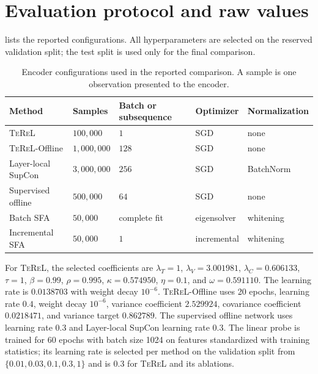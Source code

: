 \documentclass[11pt]{article}
\newcommand{\TeReL}{\textsc{TeReL}}
\newcommand{\TeReLOffline}{\TeReL{}-Offline}
\begin{document}



\appendix

\section{Evaluation protocol and raw values}
\label{app:protocol}

 lists the reported configurations. All
hyperparameters are selected on the reserved validation split; the test split
is used only for the final comparison.

\begin{table}[ht]
\centering
\caption{Encoder configurations used in the reported comparison. A sample is
one observation presented to the encoder.}
\label{tab:configuration}
\small
\begin{tabularx}{\linewidth}{lYYYY}
\toprule
Method & Samples & Batch or subsequence & Optimizer & Normalization \\
\midrule
\TeReL{} & $100{,}000$ & $1$ & SGD & none \\
\TeReLOffline{} & $1{,}000{,}000$ & $128$ & SGD & none \\
Layer-local SupCon & $3{,}000{,}000$ & $256$ & SGD & BatchNorm \\
Supervised offline & $500{,}000$ & $64$ & SGD & none \\
Batch SFA & $50{,}000$ & complete fit & eigensolver & whitening \\
Incremental SFA & $50{,}000$ & $1$ & incremental & whitening \\
\bottomrule
\end{tabularx}
\end{table}

For \TeReL{}, the selected coefficients are
$\lambda_T=1$, $\lambda_V=3.001981$, $\lambda_C=0.606133$,
$\tau=1$, $\beta=0.99$, $\rho=0.995$, $\kappa=0.574950$,
$\eta=0.1$, and $\omega=0.591110$. The learning rate is $0.0138703$ with
weight decay $10^{-6}$. \TeReLOffline{} uses 20 epochs, learning rate
$0.4$, weight decay $10^{-6}$, variance coefficient
$2.529924$, covariance coefficient $0.0218471$, and variance target
$0.862789$. The supervised offline network uses learning rate $0.3$ and
Layer-local SupCon learning rate $0.3$. The linear probe is trained for 60
epochs with batch size 1024 on features standardized with training
statistics; its learning rate is selected per method on the validation split
from $\{0.01,0.03,0.1,0.3,1\}$ and is $0.3$ for \TeReL{} and its ablations.
\end{document}

